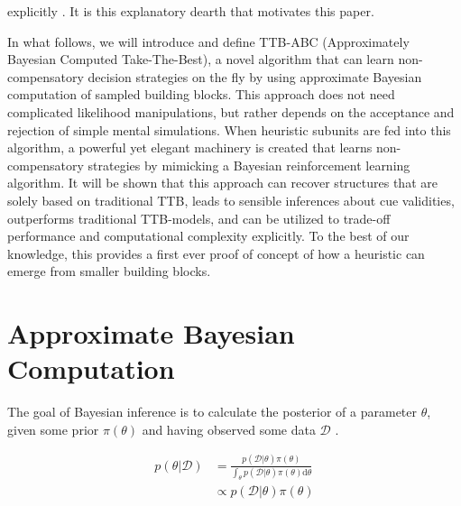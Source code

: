 \documentclass[a4paper,man, natbib]{apa6}
\begin{document}
explicitly . It is this explanatory dearth that motivates this paper.

In what follows, we will introduce and define TTB-ABC (Approximately Bayesian Computed Take-The-Best), a novel algorithm that can learn non-compensatory decision strategies on the fly by using approximate Bayesian computation of sampled building blocks. This approach does not need complicated likelihood manipulations, but rather depends on the acceptance and rejection of simple mental simulations. When heuristic subunits are fed into this algorithm, a powerful yet elegant machinery is created that learns non-compensatory strategies by mimicking a Bayesian reinforcement learning algorithm. It will be shown that this approach can recover structures that are solely based on traditional TTB, leads to sensible inferences about cue validities, outperforms traditional TTB-models, and can be utilized to trade-off performance and computational complexity explicitly. To the best of our knowledge, this provides a first ever proof of concept of how a heuristic can emerge from smaller building blocks.


\section{Approximate Bayesian Computation}
The goal of Bayesian inference is to calculate the posterior of a parameter $\theta$, given some prior $\pi(\theta)$ and having observed some data $\mathcal{D}$ \citep{lindley1972bayesian}.

\begin{align}
p(\theta|\mathcal{D})&=\frac{p(\mathcal{D}|\theta)\pi(\theta)}{\int_{\theta} p(\mathcal{D}|\theta)\pi(\theta) \text{d} \theta}\\
& \propto p(\mathcal{D}|\theta)\pi(\theta)
\end{align}
\end{document}
